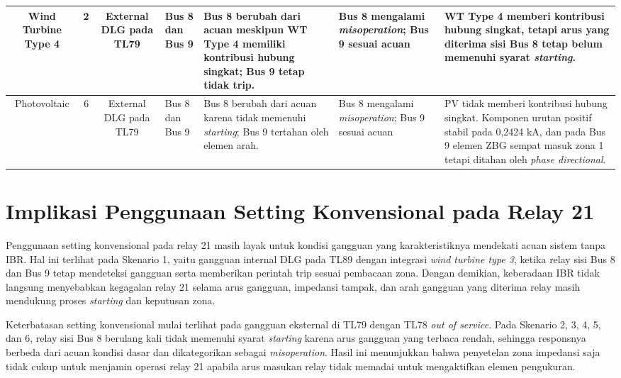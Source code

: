 \begin{table}[H]
{\begin{tabular}{|c|c|c|p{2.7cm}|p{4.5cm}|p{3.0cm}|p{6.0cm}|}
            Wind Turbine Type 4 & 2 & External DLG pada TL79 & Bus 8 dan Bus 9 & Bus 8 berubah dari acuan meskipun WT Type 4 memiliki kontribusi hubung singkat; Bus 9 tetap tidak trip. & Bus 8 mengalami \textit{misoperation}; Bus 9 sesuai acuan & WT Type 4 memberi kontribusi hubung singkat, tetapi arus yang diterima sisi Bus 8 tetap belum memenuhi syarat \textit{starting}. \\ \hline
            Photovoltaic & 6 & External DLG pada TL79 & Bus 8 dan Bus 9 & Bus 8 berubah dari acuan karena tidak memenuhi \textit{starting}; Bus 9 tertahan oleh elemen arah. & Bus 8 mengalami \textit{misoperation}; Bus 9 sesuai acuan & PV tidak memberi kontribusi hubung singkat. Komponen urutan positif stabil pada 0,2424 kA, dan pada Bus 9 elemen ZBG sempat masuk zona 1 tetapi ditahan oleh \textit{phase directional}. \\ \hline
        \end{tabular}%
    }
\end{table}

\section{Implikasi Penggunaan Setting Konvensional pada Relay 21}

Penggunaan setting konvensional pada relay 21 masih layak untuk kondisi gangguan yang karakteristiknya mendekati acuan sistem tanpa IBR. Hal ini terlihat pada Skenario 1, yaitu gangguan internal DLG pada TL89 dengan integrasi \textit{wind turbine type 3}, ketika relay sisi Bus 8 dan Bus 9 tetap mendeteksi gangguan serta memberikan perintah trip sesuai pembacaan zona. Dengan demikian, keberadaan IBR tidak langsung menyebabkan kegagalan relay 21 selama arus gangguan, impedansi tampak, dan arah gangguan yang diterima relay masih mendukung proses \textit{starting} dan keputusan zona.

Keterbatasan setting konvensional mulai terlihat pada gangguan eksternal di TL79 dengan TL78 \textit{out of service}. Pada Skenario 2, 3, 4, 5, dan 6, relay sisi Bus 8 berulang kali tidak memenuhi syarat \textit{starting} karena arus gangguan yang terbaca rendah, sehingga responsnya berbeda dari acuan kondisi dasar dan dikategorikan sebagai \textit{misoperation}. Hasil ini menunjukkan bahwa penyetelan zona impedansi saja tidak cukup untuk menjamin operasi relay 21 apabila arus masukan relay tidak memadai untuk mengaktifkan elemen pengukuran.


